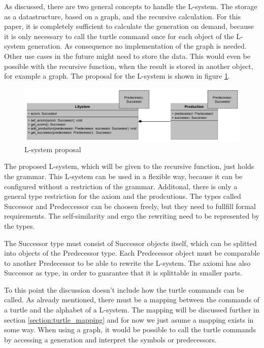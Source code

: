 \documentclass[english]{cpp-hmwk}
\begin{document}
\bigskip
 
\noindent As discussed, there are two general concepts to handle the L-system. The storage as a datastructure, based on a graph, and the recursive calculation. For this paper, it is completely sufficient to calculate the generation on demand, because it is only necessary to call the turtle command once for each object of the L-system generation. As consequence no implementation of the graph is needed. Other use cases in the future might need to store the data. This would even be possible with the recursive function, when the result is stored in another object, for example a graph. The proposal for the L-system is shown in figure \ref{figure:lsystem_proposal}.

\begin{figure}[h!]
	\centering
	\includegraphics[width=1\columnwidth]{../graphs/l_system_proposal.png}
	\caption{L-system proposal}
	\label{figure:lsystem_proposal}
\end{figure}

\medskip
\noindent The proposed L-system,  which will be given to the recursive function, just holds the grammar. This L-system can be used in a flexible way, because it can be configured without a restriction of the grammar. Additonal, there is only a general type restriction for the axiom and the prodcutions. The types called Successor and Predeccessor can be choosen freely, but they need to fullfill formal requirements. The self-similarity and ergo the rewriting need to be represented by the types.

The Successor type must consist of Successor objects itself, which can be splitted into objects of the Predecessor type. Each Predecessor object must be comparable to another Predecessor to be able to rewrite the L-system. The axiomi has also Successor as type, in order to guarantee that it is splittable in smaller parts.
 
To this point the discussion doesn't include how the turtle commands can be called. As already mentioned, there must be a mapping between the commands of a turtle and the alphabet of a L-system. The mapping will be discussed further in section \ref{section:turtle_mapping} and for now we just asume a mapping exists in some way. When using a graph, it would be possible to call the turtle commands by accessing a generation and interpret the symbols or predecessors.
\end{document}
